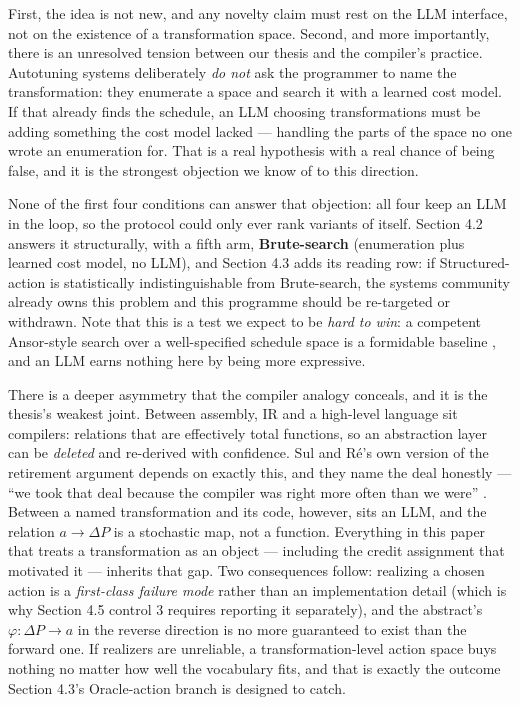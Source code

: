 \documentclass[
  11pt,
]{article}
\begin{document}
First, the idea is not new, and any novelty claim must rest on the LLM interface, not on the existence of a transformation space. Second, and more importantly, there is an unresolved tension between our thesis and the compiler's practice. Autotuning systems deliberately \emph{do not} ask the programmer to name the transformation: they enumerate a space and search it with a learned cost model. If that already finds the schedule, an LLM choosing transformations must be adding something the cost model lacked --- handling the parts of the space no one wrote an enumeration for. That is a real hypothesis with a real chance of being false, and it is the strongest objection we know of to this direction.

None of the first four conditions can answer that objection: all four keep an LLM in the loop, so the protocol could only ever rank variants of itself. Section 4.2 answers it structurally, with a fifth arm, \textbf{Brute-search} (enumeration plus learned cost model, no LLM), and Section 4.3 adds its reading row: if Structured-action is statistically indistinguishable from Brute-search, the systems community already owns this problem and this programme should be re-targeted or withdrawn. Note that this is a test we expect to be \emph{hard to win}: a competent Ansor-style search over a well-specified schedule space is a formidable baseline \cite{ansor10}, and an LLM earns nothing here by being more expressive.

There is a deeper asymmetry that the compiler analogy conceals, and it is the thesis's weakest joint. Between assembly, IR and a high-level language sit compilers: relations that are effectively total functions, so an abstraction layer can be \emph{deleted} and re-derived with confidence. Sul and Ré's own version of the retirement argument depends on exactly this, and they name the deal honestly --- ``we took that deal because the compiler was right more often than we were'' \cite{retire36}. Between a named transformation and its code, however, sits an LLM, and the relation \(a \to \Delta P\) is a stochastic map, not a function. Everything in this paper that treats a transformation as an object --- including the credit assignment that motivated it --- inherits that gap. Two consequences follow: realizing a chosen action is a \emph{first-class failure mode} rather than an implementation detail (which is why Section 4.5 control 3 requires reporting it separately), and the abstract's \(\varphi : \Delta P \to a\) in the reverse direction is no more guaranteed to exist than the forward one. If realizers are unreliable, a transformation-level action space buys nothing no matter how well the vocabulary fits, and that is exactly the outcome Section 4.3's Oracle-action branch is designed to catch.
\end{document}

